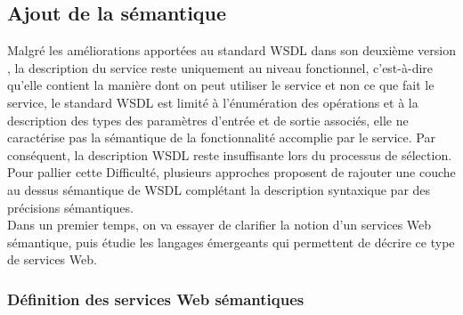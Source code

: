     \subsection{Ajout de la sémantique}
    Malgré les améliorations apportées au standard \textsc{WSDL} dans son
    deuxième version \cite{chinnici2007web}, la description du service
    reste uniquement au niveau fonctionnel, c'est-à-dire qu'elle contient
    la manière dont on peut utiliser le service et non ce que fait le
    service, le standard \textsc{WSDL} est limité à l'énumération des
    opérations et à la description des types des paramètres d'entrée et de
    sortie associés, elle ne caractérise pas la sémantique de la
    fonctionnalité accomplie par le service. Par conséquent, la
    description \textsc{WSDL} reste insuffisante lors du processus de
    sélection.  Pour pallier cette Difficulté, plusieurs approches
    proposent de rajouter une couche au dessus sémantique de \textsc{WSDL}
    complétant la description syntaxique par
    des précisions sémantiques.\\

    Dans un premier temps, on va essayer de clarifier la notion d'un
    services Web sémantique, puis étudie les langages émergeants qui
    permettent de décrire ce type de services Web.

      \subsubsection{Définition des services Web sémantiques}


